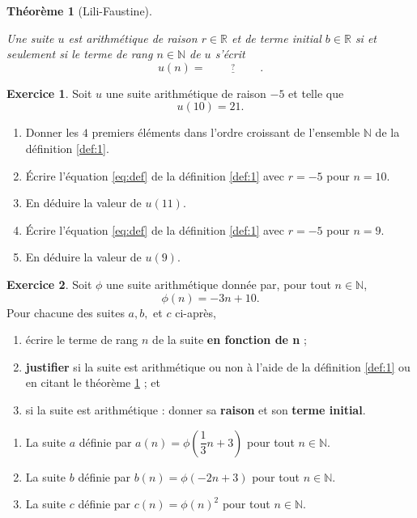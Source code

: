 \documentclass[12pt]{paper}
\theoremstyle{plain}
\newtheorem{theorem}{Th\'eor\`eme}
\theoremstyle{definition}
\newtheorem{ex}{Exercice}
\newcommand{\R}{\mathbb{R}}
\newcommand{\N}{\mathbb{N}}
\begin{document}
\begin{theorem}[Lili-Faustine]\label{thm:1}
	
	Une suite $u$ est arithmétique de raison $r\in\R$ et de terme initial $b\in\R$ si et seulement si le terme de rang $n\in\N$ de $u$ s'écrit
		\[ u(n) = \stackrel{?}{\underline{\hspace{2cm}}}.\]
		
\end{theorem}

\begin{ex}
	Soit $u$ une suite arithmétique de raison $-5$ et telle que
		\[u(10) = 21. \]
	\begin{enumerate}
		\item Donner les $4$ premiers éléments dans l'ordre croissant de l'ensemble $\N$ de la définition \ref{def:1}.
		\item Écrire l'équation \eqref{eq:def} de la définition \ref{def:1} avec $r=-5$ pour $n=10$.
		\item En déduire la valeur de $u(11)$.
		\item Écrire l'équation \eqref{eq:def} de la définition \ref{def:1} avec $r=-5$ pour $n=9$.
		\item En déduire la valeur de $u(9)$.
	\end{enumerate}
\end{ex}


\begin{ex}
	Soit $\phi$ une suite arithmétique donnée par, pour tout $n\in\N$,
		\[ \phi(n) = -3n + 10. \]
	Pour chacune des suites $a, b,$ et $c$ ci-après, 
		\begin{enumerate}[leftmargin=2cm, label=\roman*)]
			\item écrire le terme de rang $n$ de la suite \textbf{en fonction de n} ; 
			\item  \textbf{justifier} si la suite est arithmétique ou non à l'aide de la définition \ref{def:1} ou en citant le théorème \ref{thm:1} ; et
			\item si la suite est arithmétique : donner sa \textbf{raison} et son \textbf{terme initial}.
		\end{enumerate}
		\vspace{5pt}
		\begin{enumerate}[leftmargin=1cm]
			\item La suite $a$ définie par $a(n) = \phi\left(\dfrac13n+3\right)$ pour tout $n\in\N$.
			\item La suite $b$ définie par $b(n) = \phi(-2n+3)$ pour tout $n\in\N$.
			\item La suite $c$ définie par $c(n) = \phi(n)^2$ pour tout $n\in\N$.
		\end{enumerate}
\end{ex}
\end{document}
